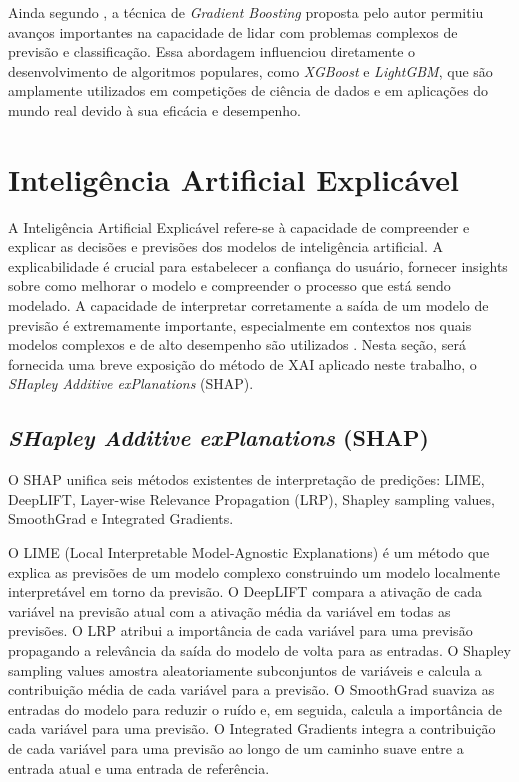 Ainda segundo , a técnica de \textit{Gradient Boosting} proposta pelo autor permitiu avanços importantes na capacidade de lidar com problemas complexos de previsão e classificação. Essa abordagem influenciou diretamente o desenvolvimento de algoritmos populares, como \textit{XGBoost} e \textit{LightGBM}, que são amplamente utilizados em competições de ciência de dados e em aplicações do mundo real devido à sua eficácia e desempenho.

\section{Inteligência Artificial Explicável}

A Inteligência Artificial Explicável refere-se à capacidade de compreender e explicar as decisões e previsões dos modelos de inteligência artificial. A explicabilidade é crucial para estabelecer a confiança do usuário, fornecer insights sobre como melhorar o modelo e compreender o processo que está sendo modelado. A capacidade de interpretar corretamente a saída de um modelo de previsão é extremamente importante, especialmente em contextos nos quais modelos complexos e de alto desempenho são utilizados \cite{Shap2017}. Nesta seção, será fornecida uma breve exposição do método de XAI aplicado neste trabalho, o \textit{SHapley Additive exPlanations} (SHAP).

\subsection{\textit{SHapley Additive exPlanations} (SHAP)}

O SHAP \cite{Shap2017} unifica seis métodos existentes de interpretação de predições: LIME, DeepLIFT, Layer-wise Relevance Propagation (LRP), Shapley sampling values, SmoothGrad e Integrated Gradients.

O LIME (Local Interpretable Model-Agnostic Explanations) \cite{Lime2016} é um método que explica as previsões de um modelo complexo construindo um modelo localmente interpretável em torno da previsão. O DeepLIFT \cite{Deeplift} compara a ativação de cada variável na previsão atual com a ativação média da variável em todas as previsões. O LRP \cite{LRP2015} atribui a importância de cada variável para uma previsão propagando a relevância da saída do modelo de volta para as entradas. O Shapley sampling values \cite{Strumbelj2014} amostra aleatoriamente subconjuntos de variáveis e calcula a contribuição média de cada variável para a previsão. O SmoothGrad \cite{SmoothGrad} suaviza as entradas do modelo para reduzir o ruído e, em seguida, calcula a importância de cada variável para uma previsão. O Integrated Gradients \cite{IntegratedGradients} integra a contribuição de cada variável para uma previsão ao longo de um caminho suave entre a entrada atual e uma entrada de referência.

